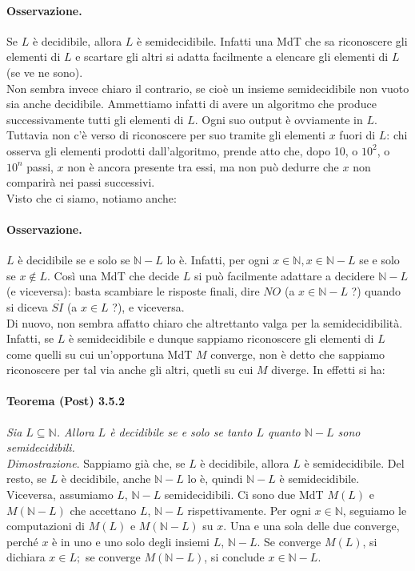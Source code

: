 \paragraph{Osservazione.} Se $L$ è decidibile, allora $L$ è semidecidibile.
Infatti una MdT che sa riconoscere gli elementi di $L$ e scartare gli altri si
adatta facilmente a elencare gli elementi di $L$ (se ve ne sono).\\

Non sembra invece chiaro il contrario, se cioè un insieme semidecidibile non
vuoto sia anche decidibile. Ammettiamo infatti di avere un algoritmo che produce
successivamente tutti gli elementi di $L$. Ogni suo output è ovviamente in $L$.
Tuttavia non c'è verso di riconoscere per suo tramite gli elementi $x$ fuori di
$L$: chi osserva gli elementi prodotti dall'algoritmo, prende atto che, dopo
10, o $10^2$, o $10^n$ passi, $x$ non è ancora presente tra essi, ma non può
dedurre che $x$ non comparirà nei passi successivi.\\
Visto che ci siamo, notiamo anche:

\paragraph{Osservazione.} $L$ è decidibile se e solo se
$\mathbb{N}-L$ lo è. Infatti, per ogni $x \in \mathbb{N}, x \in \mathbb{N}-L$ se
e solo se $x \notin L$. Così una MdT che decide $L$ si può facilmente adattare a
decidere $\mathbb{N}-L$ (e viceversa): basta scambiare le risposte finali, dire
$N O$ (a $x \in \mathbb{N}-L$ ?) quando si diceva $S \dot{I}$ (a $x \in L$ ?), e
viceversa.\\

Di nuovo, non sembra affatto chiaro che altrettanto valga per la
semidecidibilità. Infatti, se $L$ è semidecidibile e dunque sappiamo riconoscere
gli elementi di $L$ come quelli su cui un'opportuna MdT $M$ converge, non è
detto che sappiamo riconoscere per tal via anche gli altri, quetli su cui $M$
diverge. In effetti si ha:

\paragraph{Teorema (Post) 3.5.2} \textit{Sia $L \subseteq \mathbb{N}$.
    Allora $L$ è decidibile se e solo se tanto $L$ quanto $\mathbb{N}-L$ sono
    semidecidibili.}\\

\textit{Dimostrazione}. Sappiamo già che, se $L$ è decidibile, allora $L$ è
semidecidibile. Del resto, se $L$ è decidibile, anche $\mathbb{N}-L$ lo è,
quindi $\mathbb{N}-L$ è semidecidibile. Viceversa, assumiamo $L$, $\mathbb{N}-L$
semidecidibili. Ci sono due MdT $M(L)$ e $M(\mathbb{N}-L)$ che
accettano $L$, $\mathbb{N}-L$ rispettivamente. Per ogni $x \in \mathbb{N}$,
seguiamo le computazioni di $M(L)$ e $M(\mathbb{N}-L)$ su $x$. Una e una sola
delle due converge, perché $x$ è in uno e uno solo degli insiemi $L$,
$\mathbb{N}-L$. Se converge $M(L)$, si dichiara $x \in L ;$ se converge
$M(\mathbb{N}-L)$, si conclude $x \in \mathbb{N}-L$.

